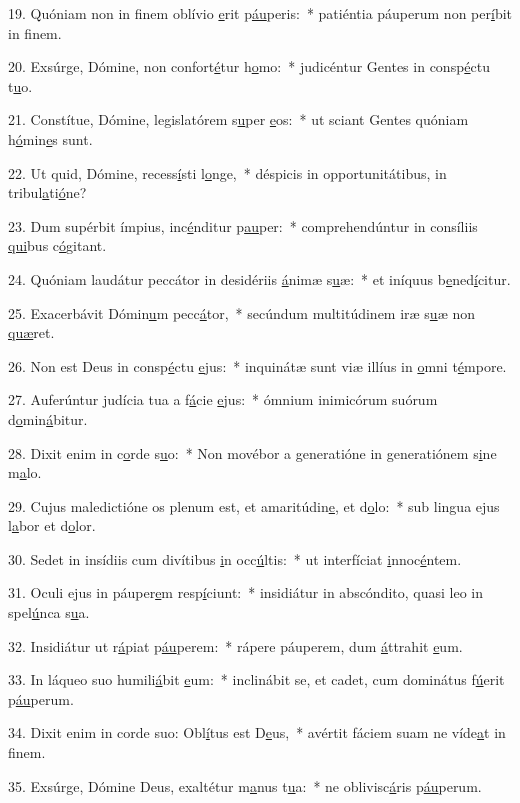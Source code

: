 19. Quóniam non in finem oblívio \uline{e}rit p\uline{áu}peris:~* patiéntia páuperum non per\uline{í}bit in f\uline{i}nem.\par 
20. Exsúrge, Dómine, non confort\uline{é}tur h\uline{o}mo:~* judicéntur Gentes in consp\uline{é}ctu t\uline{u}o.\par 
21. Constítue, Dómine, legislatórem s\uline{u}per \uline{e}os:~* ut sciant Gentes quóniam h\uline{ó}min\uline{e}s sunt.\par 
22. Ut quid, Dómine, recess\uline{í}sti l\uline{o}nge,~* déspicis in opportunitátibus, in tribul\uline{a}ti\uline{ó}ne?\par 
23. Dum supérbit ímpius, inc\uline{é}nditur p\uline{au}per:~* comprehendúntur in consíliis \uline{qui}bus c\uline{ó}gitant.\par 
24. Quóniam laudátur peccátor in desidériis \uline{á}nimæ s\uline{u}æ:~* et iníquus b\uline{e}ned\uline{í}citur.\par 
25. Exacerbávit Dómin\uline{u}m pecc\uline{á}tor,~* secúndum multitúdinem iræ s\uline{u}æ non \uline{quæ}ret.\par 
26. Non est Deus in consp\uline{é}ctu \uline{e}jus:~* inquinátæ sunt viæ illíus in \uline{o}mni t\uline{é}mpore.\par 
27. Auferúntur judícia tua a f\uline{á}cie \uline{e}jus:~* ómnium inimicórum suórum d\uline{o}min\uline{á}bitur.\par 
28. Dixit enim in c\uline{o}rde s\uline{u}o:~* Non movébor a generatióne in generatiónem s\uline{i}ne m\uline{a}lo.\par 
29. Cujus maledictióne os plenum est, et amaritúdin\uline{e}, et d\uline{o}lo:~* sub lingua ejus l\uline{a}bor et d\uline{o}lor.\par 
30. Sedet in insídiis cum divítibus \uline{i}n occ\uline{ú}ltis:~* ut interfíciat \uline{i}nnoc\uline{é}ntem.\par 
31. Oculi ejus in páuper\uline{e}m resp\uline{í}ciunt:~* insidiátur in abscóndito, quasi leo in spel\uline{ú}nca s\uline{u}a.\par 
32. Insidiátur ut r\uline{á}piat p\uline{áu}perem:~* rápere páuperem, dum \uline{á}ttrahit \uline{e}um.\par 
33. In láqueo suo humili\uline{á}bit \uline{e}um:~* inclinábit se, et cadet, cum dominátus f\uline{ú}erit p\uline{áu}perum.\par 
34. Dixit enim in corde suo: Obl\uline{í}tus est D\uline{e}us,~* avértit fáciem suam ne víde\uline{a}t in f\uline{i}nem.\par 
35. Exsúrge, Dómine Deus, exaltétur m\uline{a}nus t\uline{u}a:~* ne oblivisc\uline{á}ris p\uline{áu}perum.\par 
